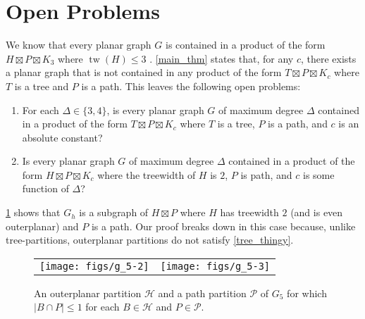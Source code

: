 \documentclass{patmorin}
\DeclareMathOperator{\tw}{tw}
\renewcommand{\le}{\leqslant}
\begin{document}
\section{Open Problems}

We know that every planar graph $G$ is contained in a product of the form $H\boxtimes P\boxtimes K_3$ where $\tw(H)\le 3$ \cite{dujmovic.joret.ea:planar}. \cref{main_thm} states that, for any $c$, there exists a planar graph that is not contained in any product of the form $T\boxtimes P\boxtimes K_c$ where $T$ is a tree and $P$ is a path.  This leaves the following open problems:

\begin{enumerate}
  \item For each $\Delta\in\{3,4\}$, is every planar graph $G$ of maximum degree $\Delta$ contained in a product of the form $T\boxtimes P\boxtimes K_c$ where $T$ is a tree, $P$ is a path, and $c$ is an absolute constant?

  \item Is every planar graph $G$ of maximum degree $\Delta$ contained in a product of the form $H\boxtimes P\boxtimes K_c$ where the treewidth of $H$ is $2$, $P$ is path, and $c$ is some function of $\Delta$?
\end{enumerate}

\cref{two_tree} shows that $G_h$ is a subgraph of $H\boxtimes P$ where $H$ has treewidth $2$ (and is even outerplanar) and $P$ is a path. Our proof breaks down in this case because, unlike tree-partitions, outerplanar partitions do not satisfy \cref{tree_thingy}.

\begin{figure}
  \begin{center}
    \begin{tabular}{cc}
      \texttt{[image: figs/g\_5-2]} & \texttt{[image: figs/g\_5-3]}
    \end{tabular}
  \end{center}
  \caption{An outerplanar partition $\mathcal{H}$ and a path partition $\mathcal{P}$ of $G_5$ for which $|B\cap P|\le 1$ for each $B\in\mathcal{H}$ and $P\in\mathcal{P}$.}
  \label{two_tree}
\end{figure}



\end{document}
